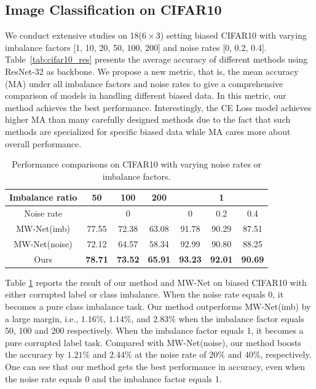 \documentclass[letterpaper]{article} %
\begin{document}
\subsection{Image Classification on CIFAR10} \label{sec:vis_cifar10}

We conduct extensive studies on 18($6 \times 3$) setting biased CIFAR10 with varying imbalance factors [1, 10, 20, 50, 100, 200] and noise rates [0, 0.2, 0.4].
Table~\ref{tab:cifar10_res} presents the average accuracy of different methods using ResNet-32 as backbone.
We propose a new metric, that is, the mean accuracy (MA) under all imbalance factors and noise rates to give a comprehensive comparison of models in handling different biased data.
In this metric, our method achieves the best performance.
Interestingly, the CE Loss model achieves higher MA than many carefully designed methods due to the fact that such methods are specialized for specific biased data while MA cares more about overall performance.

\begin{table}[t]
\begin{center}
\begin{adjustbox}{max width=0.47\textwidth}
    \begin{tabular}{c|c|c|c|c|c|c}
    \hline
    Imbalance ratio & 50    & 100   & 200   & \multicolumn{3}{c}{1} \\
    \hline
    Noise rate & \multicolumn{3}{c|}{0} & 0     & 0.2   & 0.4 \\
    \hline
    MW-Net(imb) & 77.55 & 72.38 & 63.08 & 91.78 & 90.29 & 87.51 \\
    MW-Net(noise) & 72.12  & 64.57  & 58.34  & 92.99  & 90.80  & 88.25  \\
    Ours  & \textbf{78.71} & \textbf{73.52} & \textbf{65.91} & \textbf{93.23} & \textbf{92.01} & \textbf{90.69} \\
    \hline
    \end{tabular}%
\end{adjustbox}
\caption{Performance comparisons on CIFAR10 with varying noise rates or imbalance factors.
}
\label{tab:cifar10_res_d}
\end{center}
\end{table}

Table \ref{tab:cifar10_res_d} reports the result of our method and MW-Net on biased CIFAR10 with either corrupted label or class imbalance.
When the noise rate equals 0, it becomes a pure class imbalance task.
Our method outperforms MW-Net(imb) by a large margin, i.e., $1.16\%$, $1.14\%$, and $2.83\%$ when the imbalance factor equals 50, 100 and 200 respectively.
When the imbalance factor equals 1, it becomes a pure corrupted label task.
Compared with MW-Net(noise), our method boosts the accuracy by $1.21\%$ and $2.44\%$ at the noise rate of $20\%$ and $40\%$, respectively.
One can see that our method gets the best performance in accuracy, even when the noise rate equals 0 and the imbalance factor equals 1.
\end{document}
